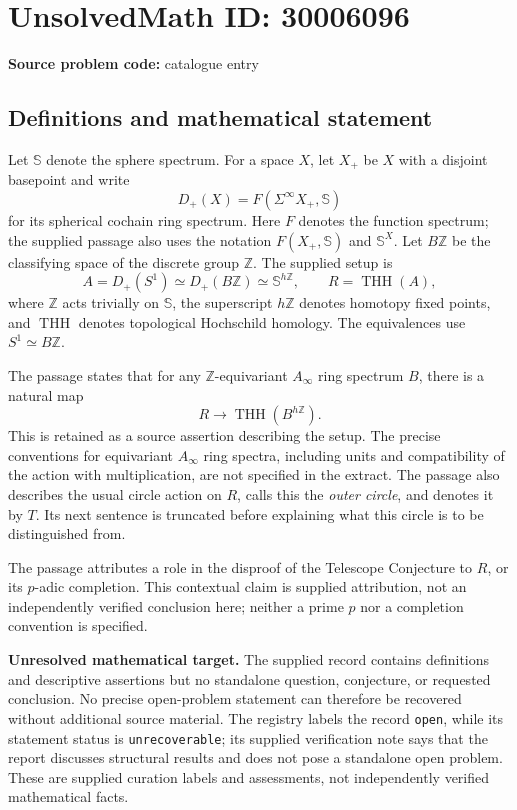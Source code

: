 \documentclass[11pt]{article}
\newcommand{\Z}{\mathbb{Z}}
\begin{document}
\section*{UnsolvedMath ID: 30006096}
\textbf{Source problem code:} catalogue entry
\subsection{Definitions and mathematical statement}
Let \(\mathbb S\) denote the sphere spectrum. For a space \(X\), let \(X_+\) be \(X\) with a disjoint basepoint and write
\[
D_+(X)=F(\Sigma^\infty X_+,\mathbb S)
\]
for its spherical cochain ring spectrum. Here \(F\) denotes the function spectrum; the supplied passage also uses the notation \(F(X_+,\mathbb S)\) and \(\mathbb S^X\). Let \(B\Z\) be the classifying space of the discrete group \(\Z\). The supplied setup is
\[
A=D_+(S^1)\simeq D_+(B\Z)\simeq\mathbb S^{h\Z},
\qquad R=\operatorname{THH}(A),
\]
where \(\Z\) acts trivially on \(\mathbb S\), the superscript \(h\Z\) denotes homotopy fixed points, and \(\operatorname{THH}\) denotes topological Hochschild homology. The equivalences use \(S^1\simeq B\Z\).

The passage states that for any \(\Z\)-equivariant \(A_\infty\) ring spectrum \(B\), there is a natural map
\[
R\longrightarrow\operatorname{THH}(B^{h\Z}).
\]
This is retained as a source assertion describing the setup. The precise conventions for equivariant \(A_\infty\) ring spectra, including units and compatibility of the action with multiplication, are not specified in the extract. The passage also describes the usual circle action on \(R\), calls this the \emph{outer circle}, and denotes it by \(T\). Its next sentence is truncated before explaining what this circle is to be distinguished from.

The passage attributes a role in the disproof of the Telescope Conjecture to \(R\), or its \(p\)-adic completion. This contextual claim is supplied attribution, not an independently verified conclusion here; neither a prime \(p\) nor a completion convention is specified.

\textbf{Unresolved mathematical target.} The supplied record contains definitions and descriptive assertions but no standalone question, conjecture, or requested conclusion. No precise open-problem statement can therefore be recovered without additional source material. The registry labels the record \texttt{open}, while its statement status is \texttt{unrecoverable}; its supplied verification note says that the report discusses structural results and does not pose a standalone open problem. These are supplied curation labels and assessments, not independently verified mathematical facts.
\end{document}
